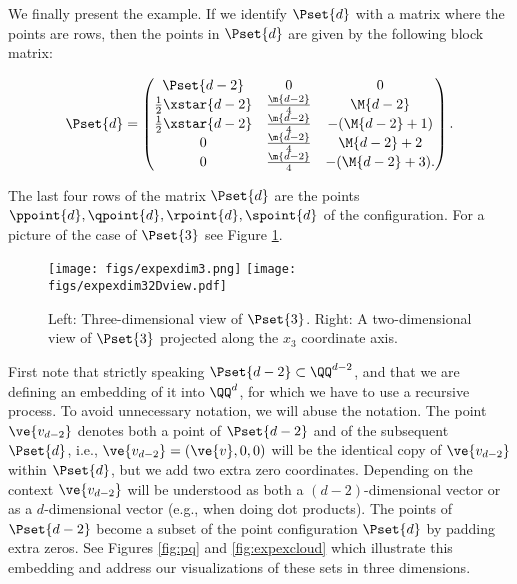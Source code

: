 We finally present the example. If we identify $\Pset{d}$ with a matrix where the points are rows, then the points in $\Pset{d}$ are given by the following block matrix:

\[
\Pset{d} =
\begin{pmatrix}
\Pset{d-2} & 0 & 0 \\
\frac{1}{2} \xstar{d-2} & \frac{\m{d-2}}{4} & \M{d-2} \\
\frac{1}{2} \xstar{d-2} & \frac{\m{d-2}}{4} & -(\M{d-2}+1) \\
0 & \frac{\m{d-2}}{4} & \M{d-2}+2 \\
0 & \frac{\m{d-2}}{4} & -(\M{d-2}+3).
\end{pmatrix}.
\]

The last four rows of the matrix $\Pset{d}$ are the points $\ppoint{d}, \qpoint{d}, \rpoint{d}, \spoint{d}$ of the configuration. For a picture of the case of $\Pset{3}$ see Figure \ref{fig:pqdim3}.
\begin{figure}[ht]
\texttt{[image: figs/expexdim3.png]}
\texttt{[image: figs/expexdim32Dview.pdf]}
\caption{Left: Three-dimensional view of $\Pset{3}$. Right: A two-dimensional view of $\Pset{3}$ projected along the $x_3$ coordinate axis.}\label{fig:pqdim3}
\end{figure}


\begin{remark}
First note that strictly speaking $\Pset{d-2} \subset \QQ^{d-2}$, and that we are defining an embedding of it into
$\QQ^d$, for which we have to use a recursive process. To avoid unnecessary notation, we will abuse the notation. The point $\ve{v_{d-2}}$ denotes both a point of $\Pset{d-2}$ and of the subsequent $\Pset{d}$, i.e., $\ve{v_{d-2}}=(\ve{v},0,0)$ will be the 
identical copy of $\ve{v_{d-2}}$ within $\Pset{d}$, but we add two extra zero coordinates. Depending on the context 
$\ve{v_{d-2}}$ will be understood as both a $(d-2)$-dimensional vector or as a $d$-dimensional vector (e.g., when
doing dot products). The points of $\Pset{d-2}$ become a subset of the point configuration $\Pset{d}$ by padding extra zeros.  See Figures \ref{fig:pq} and \ref{fig:expexcloud} which illustrate this embedding and address our visualizations of these sets in three dimensions.
\end{remark}

